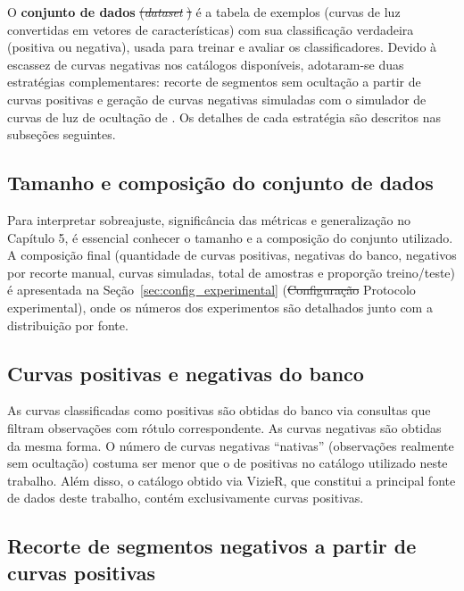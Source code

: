 \documentclass[msc]{on} %
\makeatletter
\providecommand{\DIFaddtex}[1]{{\protect\color{red}#1}} %
\providecommand{\DIFdeltex}[1]{{\protect\color{red}\sout{#1}}} %
\providecommand{\DIFaddbegin}{} %
\providecommand{\DIFaddend}{} %
\providecommand{\DIFdelbegin}{} %
\providecommand{\DIFdelend}{} %
\providecommand{\DIFadd}[1]{\texorpdfstring{\DIFaddtex{#1}}{#1}} %
\providecommand{\DIFdel}[1]{\texorpdfstring{\DIFdeltex{#1}}{}} %
\let\sout@orig\sout %
\renewcommand{\sout}[1]{\ifmmode\text{\sout@orig{\ensuremath{#1}}}\else\sout@orig{#1}\fi} %
\makeatother
\begin{document}
O \textbf{conjunto de dados} \DIFdelbegin \DIFdel{(}\textit{\DIFdel{dataset}}%
\DIFdel{) }\DIFdelend é a tabela de exemplos (curvas de luz convertidas em vetores de características) com sua classificação verdadeira (positiva ou negativa), usada para treinar e avaliar os classificadores. Devido à escassez de curvas negativas nos catálogos disponíveis, adotaram-se duas estratégias complementares: recorte de segmentos sem ocultação a partir de curvas positivas e geração de curvas negativas simuladas com o simulador de curvas de luz de ocultação de \citet{Simulator}. Os detalhes de cada estratégia são descritos nas subseções seguintes.

\subsection{Tamanho e composição do conjunto de dados}

Para interpretar sobreajuste, significância das métricas e generalização no Capítulo 5, é essencial conhecer o tamanho e a composição do conjunto utilizado. A composição final (quantidade de curvas positivas, negativas do banco, negativos por recorte manual, curvas simuladas, total de amostras e proporção treino/teste) é apresentada na Seção~\ref{sec:config_experimental} (\DIFdelbegin \DIFdel{Configuração }\DIFdelend\ifhmode\hskip0pt\fi \DIFaddbegin \DIFadd{Protocolo }\DIFaddend experimental), onde os números dos experimentos são detalhados junto com a distribuição por fonte.

\subsection{Curvas positivas e negativas do banco}

As curvas classificadas como positivas são obtidas do banco via consultas que filtram observações com rótulo correspondente. As curvas negativas são obtidas da mesma forma. O número de curvas negativas ``nativas'' (observações realmente sem ocultação) costuma ser menor que o de positivas no catálogo utilizado neste trabalho. Além disso, o catálogo obtido via VizieR, que constitui a principal fonte de dados deste trabalho, contém exclusivamente curvas positivas.

\subsection{Recorte de segmentos negativos a partir de curvas positivas}
\end{document}
